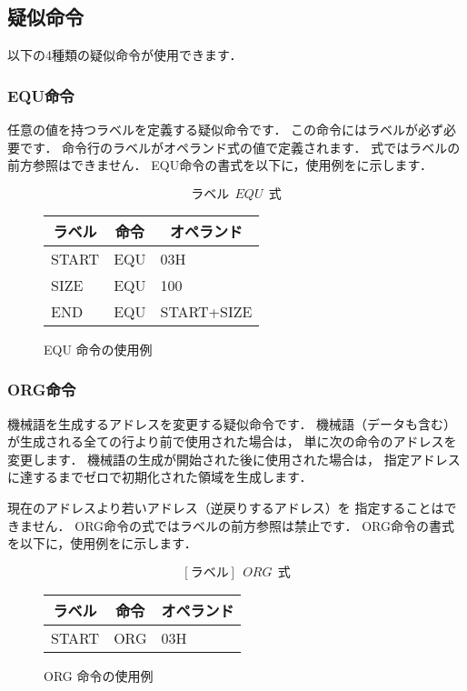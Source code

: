 \subsection{疑似命令}
以下の4種類の疑似命令が使用できます．

\subsubsection{EQU命令}
任意の値を持つラベルを定義する疑似命令です．
この命令にはラベルが必ず必要です．
命令行のラベルがオペランド式の値で定義されます．
式ではラベルの前方参照はできません．
EQU命令の書式を以下に，使用例をに示します．

{\small\[ ラベル~~EQU~~式 \]}

\begin{figure}[btp]
\begin{center}
{\tt\small\begin{tabular}{|l|l|l|}\hline
\multicolumn{1}{|c|}{ラベル} & 
        \multicolumn{1}{c|}{命令} & \multicolumn{1}{c|}{オペランド} \\\hline
START & EQU & 03H \\
SIZE  & EQU & 100 \\
END   & EQU & START+SIZE \\\hline
\end{tabular}}
\caption{EQU 命令の使用例}
\label{fig:appB:equ}
\end{center}
\end{figure}

\subsubsection{ORG命令}
機械語を生成するアドレスを変更する疑似命令です．
機械語（データも含む）が生成される全ての行より前で使用された場合は，
単に次の命令のアドレスを変更します．
機械語の生成が開始された後に使用された場合は，
指定アドレスに達するまでゼロで初期化された領域を生成します．

現在のアドレスより若いアドレス（逆戻りするアドレス）を
指定することはできません．
ORG命令の式ではラベルの前方参照は禁止です．
ORG命令の書式を以下に，使用例をに示します．

{\small\[ [ラベル]~~ORG~~式\]}

\begin{figure}[btp]
\begin{center}
{\tt\small\begin{tabular}{|l|l|l|}\hline
\multicolumn{1}{|c|}{ラベル} & 
        \multicolumn{1}{c|}{命令} & \multicolumn{1}{c|}{オペランド} \\\hline
START & ORG & 03H \\\hline
\end{tabular}}
\caption{ORG 命令の使用例}
\label{fig:appB:org}
\end{center}
\end{figure}

